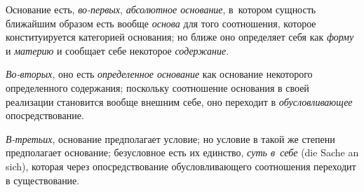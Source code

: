 Основание есть, {\em во-первых}, {\em абсолютное основание}, в~котором сущность
ближайшим образом есть вообще {\em основа} для того соотношения, которое
конституируется категорией основания; но ближе оно определяет себя как
{\em форму} и {\em материю} и сообщает себе некоторое {\em содержание}.

{\em Во-вторых}, оно есть {\em определенное основание} как основание некоторого
определенного содержания; поскольку соотношение основания в своей реализации
становится вообще внешним себе, оно переходит в {\em обусловливающее}
опосредствование.

{\em В-третьих}, основание предполагает условие; но условие в такой же степени
предполагает основание; безусловное есть их единство, {\em суть в~себе}
(die Sache an sich), которая через опосредствование обусловливающего
соотношения переходит в существование.


